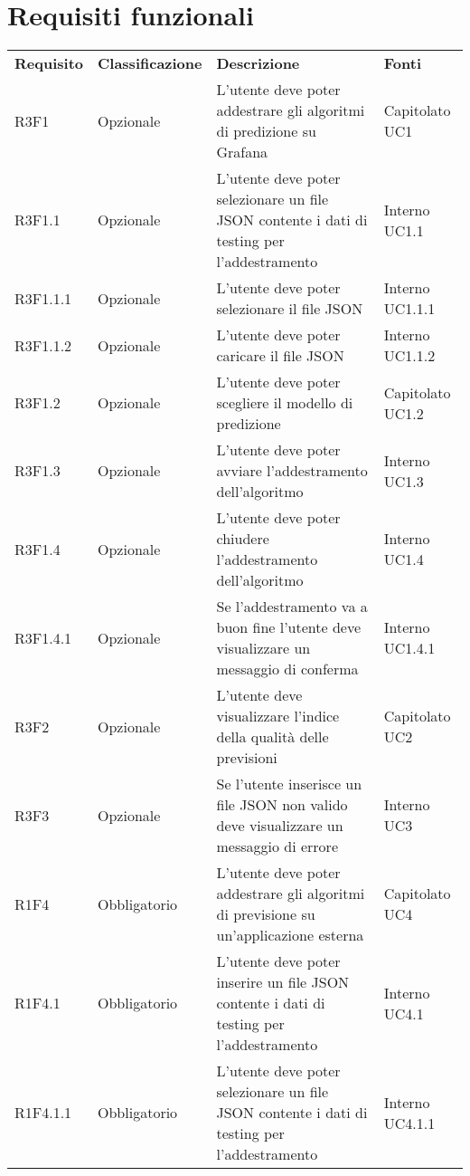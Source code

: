 \section{Requisiti funzionali}
	\setcounter{table}{0}
	\begin{longtable} {
		>{}p{24mm} 
		>{}p{32mm}
		>{}p{40mm} 
		>{}p{24.5mm}
		}
	\rowcolor{gray!50}
		\textbf{Requisito} & \textbf{Classificazione} & \textbf{Descrizione} & \textbf{Fonti} 	\TBstrut \\
		R3F1 & Opzionale & L'utente deve poter addestrare gli algoritmi di predizione su Grafana\glo & Capitolato UC1 \TBstrut \\ [2mm]
		R3F1.1 & Opzionale & L'utente deve poter selezionare un file JSON contente i dati di testing per l'addestramento & Interno UC1.1 \TBstrut \\ [2mm]
		R3F1.1.1 & Opzionale & L'utente deve poter selezionare il file JSON & Interno UC1.1.1 \TBstrut \\ [2mm]
		R3F1.1.2 & Opzionale & L'utente deve poter caricare il file JSON & Interno UC1.1.2 \TBstrut \\ [2mm]
		R3F1.2 & Opzionale & L'utente deve poter scegliere il modello di predizione & Capitolato UC1.2 \TBstrut \\ [2mm]
		R3F1.3 & Opzionale & L'utente deve poter avviare l'addestramento dell'algoritmo & Interno UC1.3 \TBstrut \\ [2mm]
		R3F1.4 & Opzionale & L'utente deve poter chiudere l'addestramento dell'algoritmo & Interno UC1.4 \TBstrut \\ [2mm]
		R3F1.4.1 & Opzionale & Se l'addestramento va a buon fine l'utente deve visualizzare un messaggio di conferma & Interno UC1.4.1 \TBstrut \\ [2mm]		
		R3F2 & Opzionale & L'utente deve visualizzare l'indice della qualità delle previsioni & Capitolato UC2 \TBstrut \\ [2mm]
		R3F3 & Opzionale & Se l'utente inserisce un file JSON non valido deve visualizzare un messaggio di errore & Interno UC3 \TBstrut \\ [2mm]		
		R1F4 & Obbligatorio & L'utente deve poter addestrare gli algoritmi di previsione su un'applicazione esterna & Capitolato UC4 \TBstrut \\ [2mm]		
		R1F4.1 & Obbligatorio & L'utente deve poter inserire un file JSON contente i dati di testing per l'addestramento & Interno UC4.1 \TBstrut \\ [2mm]		
		R1F4.1.1 & Obbligatorio & L'utente deve poter selezionare un file JSON contente i dati di testing per l'addestramento & Interno UC4.1.1 \TBstrut \\ [2mm]

\end{longtable}
